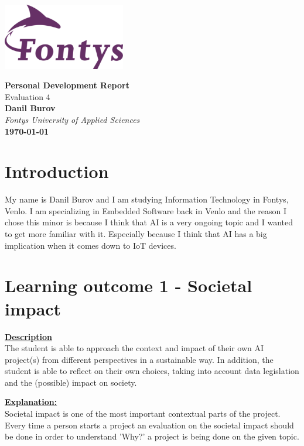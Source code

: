 \documentclass{article}
\begin{document}
	
	\begin{titlepage}
		\centering
		\vspace*{3cm}
		
		\includegraphics[width=0.4\textwidth]{images/fontyslogo.png} %
		\vspace{1.5cm}
		
		{\Huge\bfseries Personal Development Report}\\[1cm]
		{\LARGE Evaluation 4}\\[2cm]
		
		\textbf{Danil Burov}\\
		\vspace{0.5cm}
		\textit{Fontys University of Applied Sciences}\\[3cm]
		\vfill
		\textbf{\today}
		
	\end{titlepage}
	\newpage
	\tableofcontents
	\newpage
	
	\section{Introduction}
	My name is Danil Burov and I am studying Information Technology in Fontys, Venlo. I am specializing in 
	Embedded Software back in Venlo and the reason I chose this minor is because I think that AI is a very 
	ongoing topic and I wanted to get more familiar with it. Especially because I think that AI has a big 
	implication when it comes down to IoT devices.
	
	\section{Learning outcome 1 - Societal impact}
	\underline{\textbf{Description}}\\
	The student is able to approach the context and impact of their own AI project(s) 
	from different perspectives in a sustainable way. In addition, the student is able to 
	reflect on their own choices, taking into account data legislation and the (possible) impact on society.
	
	\underline{\textbf{Explanation:}}\\
	Societal impact is one of the most important contextual parts of the project. Every time a person 
	starts a project an evaluation on the societal impact should be done in order to understand 'Why?'
	a project is being done on the given topic.
	
\end{document}
